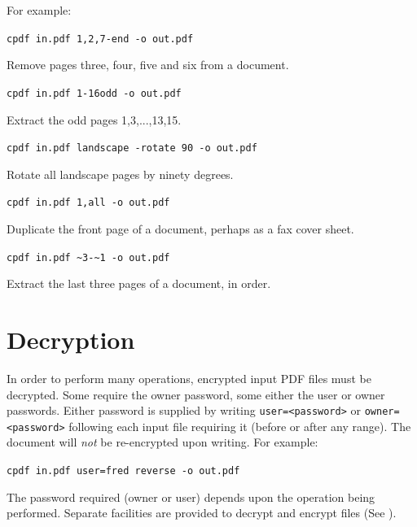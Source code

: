 \documentclass[a4paper,makeidx]{memoir}
\begin{document}
  \noindent For example:
  \begin{framed}
  \small\verb!cpdf in.pdf 1,2,7-end -o out.pdf!

  \vspace{2.5mm}
  \noindent Remove pages three, four, five and six from a document.

  \vspace{2.5mm}
  \verb!cpdf in.pdf 1-16odd -o out.pdf!

  \vspace{2.5mm}
  \noindent Extract the odd pages 1,3,...,13,15.
  
  \vspace{2.5mm}
  \verb!cpdf in.pdf landscape -rotate 90 -o out.pdf!

  \vspace{2.5mm}
  \noindent Rotate all landscape pages by ninety degrees.
    
  \vspace{2.5mm}
  \verb!cpdf in.pdf 1,all -o out.pdf!

  \vspace{2.5mm}
  \noindent Duplicate the front page of a document, perhaps as a fax cover sheet.

  \vspace{2.5mm}
  \verb!cpdf in.pdf ~3-~1 -o out.pdf!

  \vspace{2.5mm}
  \noindent Extract the last three pages of a document, in order.

  \end{framed}

  \section{Decryption}
  In order to perform many operations, encrypted input PDF files must be
decrypted. Some require the owner password, some either the user or owner
passwords. Either password is supplied by writing \texttt{user=<password>} or
\texttt{owner=<password>} following each input file requiring it (before or
after any range). The document will \textit{not} be re-encrypted upon writing.  For
example:

\begin{framed}
\small\verb!cpdf in.pdf user=fred reverse -o out.pdf!
\end{framed}
\noindent The password required (owner or user) depends upon the operation
being performed. Separate facilities are provided to decrypt and encrypt files
(See ). 
\end{document}
